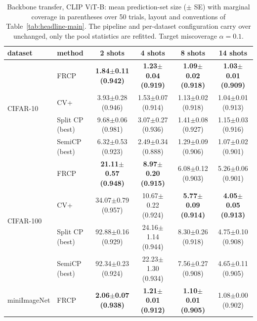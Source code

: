 \begin{table}[t]
\centering
\small
\caption{Backbone transfer, CLIP ViT-B: mean prediction-set size ($\pm$ SE) with marginal coverage in parentheses over 50 trials, layout and conventions of Table~\ref{tab:headline-main}. The pipeline and per-dataset configuration carry over unchanged, only the pool statistics are refitted. Target miscoverage $\alpha=0.1$.}
\label{tab:backbone-clipb}
\begin{tabular}{llcccc}
\toprule
dataset & method & 2 shots & 4 shots & 8 shots & 14 shots\\
\midrule
\multirow{4}{*}{CIFAR-10} & FRCP & \textbf{1.84$\pm$0.11 {\scriptsize(0.942)}} & \textbf{1.23$\pm$0.04 {\scriptsize(0.919)}} & \textbf{1.09$\pm$0.02 {\scriptsize(0.918)}} & \textbf{1.03$\pm$0.01 {\scriptsize(0.909)}}\\
 & CV+ & 3.93$\pm$0.28 {\scriptsize(0.946)} & 1.53$\pm$0.07 {\scriptsize(0.914)} & 1.13$\pm$0.02 {\scriptsize(0.918)} & 1.04$\pm$0.01 {\scriptsize(0.913)}\\
 & Split CP (best) & 9.68$\pm$0.06 {\scriptsize(0.981)} & 3.07$\pm$0.27 {\scriptsize(0.936)} & 1.41$\pm$0.08 {\scriptsize(0.927)} & 1.15$\pm$0.03 {\scriptsize(0.916)}\\
 & SemiCP (best) & 6.32$\pm$0.53 {\scriptsize(0.923)} & 2.49$\pm$0.34 {\scriptsize(0.888)} & 1.29$\pm$0.09 {\scriptsize(0.906)} & 1.07$\pm$0.02 {\scriptsize(0.901)}\\
\midrule
\multirow{4}{*}{CIFAR-100} & FRCP & \textbf{21.11$\pm$0.57 {\scriptsize(0.948)}} & \textbf{8.97$\pm$0.20 {\scriptsize(0.915)}} & 6.08$\pm$0.12 {\scriptsize(0.903)} & 5.26$\pm$0.06 {\scriptsize(0.901)}\\
 & CV+ & 34.07$\pm$0.79 {\scriptsize(0.957)} & 10.67$\pm$0.22 {\scriptsize(0.924)} & \textbf{5.77$\pm$0.09 {\scriptsize(0.914)}} & \textbf{4.05$\pm$0.05 {\scriptsize(0.913)}}\\
 & Split CP (best) & 92.88$\pm$0.16 {\scriptsize(0.929)} & 24.16$\pm$1.14 {\scriptsize(0.944)} & 8.30$\pm$0.26 {\scriptsize(0.918)} & 4.75$\pm$0.10 {\scriptsize(0.908)}\\
 & SemiCP (best) & 92.34$\pm$0.23 {\scriptsize(0.924)} & 22.23$\pm$1.30 {\scriptsize(0.934)} & 7.56$\pm$0.27 {\scriptsize(0.908)} & 4.65$\pm$0.11 {\scriptsize(0.905)}\\
\midrule
\multirow{4}{*}{miniImageNet} & FRCP & \textbf{2.06$\pm$0.07 {\scriptsize(0.938)}} & \textbf{1.21$\pm$0.01 {\scriptsize(0.912)}} & \textbf{1.10$\pm$0.01 {\scriptsize(0.905)}} & 1.08$\pm$0.00 {\scriptsize(0.902)}\\

\end{tabular}
\end{table}
